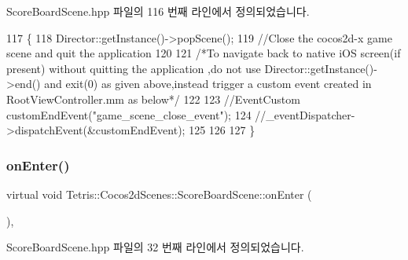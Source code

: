 Score\+Board\+Scene.\+hpp 파일의 116 번째 라인에서 정의되었습니다.


\begin{DoxyCode}
117             \{
118                 Director::getInstance()->popScene();
119                 \textcolor{comment}{//Close the cocos2d-x game scene and quit the application}
120              
121                 \textcolor{comment}{/*To navigate back to native iOS screen(if present) without quitting the application  ,do
       not use Director::getInstance()->end() and exit(0) as given above,instead trigger a custom event created in
       RootViewController.mm as below*/}
122                 
123                 \textcolor{comment}{//EventCustom customEndEvent("game\_scene\_close\_event");}
124                 \textcolor{comment}{//\_eventDispatcher->dispatchEvent(&customEndEvent);}
125                 
126                 
127             \}
\end{DoxyCode}
\mbox{\label{class_tetris_1_1_cocos2d_scenes_1_1_score_board_scene_a667d5d9ca7709281c7b67814e5495a26}} 
\subsubsection{\texorpdfstring{on\+Enter()}{onEnter()}}
{\footnotesize\ttfamily virtual void Tetris\+::\+Cocos2d\+Scenes\+::\+Score\+Board\+Scene\+::on\+Enter (\begin{DoxyParamCaption}{ }\end{DoxyParamCaption})\hspace{0.3cm}{\ttfamily [inline]}, {\ttfamily [virtual]}}



Score\+Board\+Scene.\+hpp 파일의 32 번째 라인에서 정의되었습니다.


